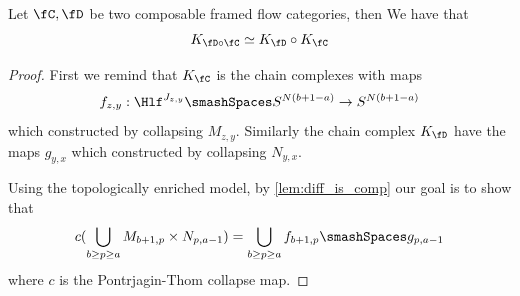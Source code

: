 \begin{lem}
    Let $\fC,\fD$ be two composable framed flow categories, then We have that
    \begin{equation*}
        K_{\fD \circ \fC} \simeq K_{\fD} \circ K_{\fC}
    \end{equation*}
\end{lem}
\begin{proof}
    First we remind that $K_{\fC}$ is the chain complexes with maps
    \begin{equation*}
        f_{z,y}: \Hlf^{J_{z,y}} \smashSpaces S^{N(b+1-a)} \to S^{N(b+1-a)}
    \end{equation*}
    which constructed by collapsing $M_{z,y}$. Similarly the chain complex $K_{\fD}$ have the maps $g_{y,x}$ which constructed by collapsing $N_{y,x}$.
    
    Using the topologically enriched model, by \cref{lem:diff_is_comp} our goal is to show that
    \begin{equation*}
        c(\bigcup_{b \geq p\geq a} M_{b+1,p}\times N_{p,a-1}) = \bigcup_{b \geq p\geq a} f_{b+1,p}\smashSpaces g_{p,a-1}
    \end{equation*}
    where $c$ is the Pontrjagin-Thom collapse map.


\end{proof}
